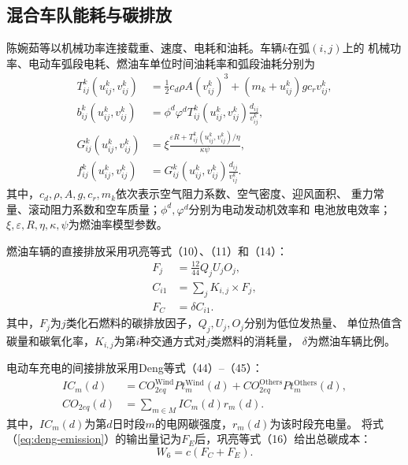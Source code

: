 \subsection{混合车队能耗与碳排放}

陈婉茹等\cite{ref:23}以机械功率连接载重、速度、电耗和油耗。车辆$k$在弧$(i,j)$上的
机械功率、电动车弧段电耗、燃油车单位时间油耗率和弧段油耗分别为
\begin{align}
T_{ij}^{k}(u_{ij}^{k},v_{ij}^{k})
&=\frac{1}{2}c_d\rho A(v_{ij}^{k})^3
+(m_k+u_{ij}^{k})gc_rv_{ij}^{k},
\label{eq:chen-power}\\
b_{ij}^{k}(u_{ij}^{k},v_{ij}^{k})
&=\phi^{d}\varphi^{d}T_{ij}^{k}(u_{ij}^{k},v_{ij}^{k})
\frac{d_{ij}}{v_{ij}^{k}},
\label{eq:chen-electricity}\\
G_{ij}^{k}(u_{ij}^{k},v_{ij}^{k})
&=\xi\frac{\varepsilon R+T_{ij}^{k}(u_{ij}^{k},v_{ij}^{k})/\eta}{\kappa\psi},
\label{eq:chen-fuel-rate}\\
f_{ij}^{k}(u_{ij}^{k},v_{ij}^{k})
&=G_{ij}^{k}(u_{ij}^{k},v_{ij}^{k})\frac{d_{ij}}{v_{ij}^{k}}.
\label{eq:chen-fuel}
\end{align}
其中，$c_d,\rho,A,g,c_r,m_k$依次表示空气阻力系数、空气密度、迎风面积、
重力常量、滚动阻力系数和空车质量；$\phi^d,\varphi^d$分别为电动发动机效率和
电池放电效率；$\xi,\varepsilon,R,\eta,\kappa,\psi$为燃油率模型参数。

燃油车辆的直接排放采用巩亮等\cite{ref:95}式（10）、（11）和（14）：
\begin{align}
F_j&=\frac{12}{44}Q_jU_jO_j,
\label{eq:gong-factor}\\
C_{i1}&=\sum_j K_{i,j}\times F_j,
\label{eq:gong-direct}\\
F_C&=\delta C_{i1}.
\label{eq:gong-fc}
\end{align}
其中，$F_j$为$j$类化石燃料的碳排放因子，$Q_j,U_j,O_j$分别为低位发热量、
单位热值含碳量和碳氧化率，$K_{i,j}$为第$i$种交通方式对$j$类燃料的消耗量，
$\delta$为燃油车辆比例。

电动车充电的间接排放采用Deng等\cite{ref:96}式（44）--（45）：
\begin{align}
IC_m(d)&=CO_{2eq}^{\mathrm{Wind}}Pt_m^{\mathrm{Wind}}(d)
+CO_{2eq}^{\mathrm{Others}}Pt_m^{\mathrm{Others}}(d),
\label{eq:deng-intensity}\\
CO_{2eq}(d)&=\sum_{m\in M}IC_m(d)r_m(d).
\label{eq:deng-emission}
\end{align}
其中，$IC_m(d)$为第$d$日时段$m$的电网碳强度，$r_m(d)$为该时段充电量。
将式（\ref{eq:deng-emission}）的输出量记为$F_E$后，巩亮等\cite{ref:95}式（16）给出总碳成本：
\begin{equation}
W_6=c(F_C+F_E).
\label{eq:gong-carbon-cost}
\end{equation}

